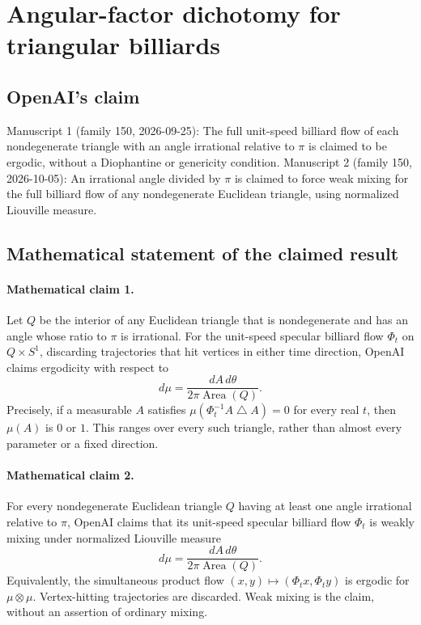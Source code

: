 \documentclass[11pt]{article}
\begin{document}
\section*{Angular-factor dichotomy for triangular billiards}

\subsection{OpenAI's claim}
Manuscript 1 (family 150, 2026-09-25): The full unit-speed billiard flow of each nondegenerate triangle with an angle irrational relative to $\pi$ is claimed to be ergodic, without a Diophantine or genericity condition. Manuscript 2 (family 150, 2026-10-05): An irrational angle divided by $\pi$ is claimed to force weak mixing for the full billiard flow of any nondegenerate Euclidean triangle, using normalized Liouville measure.

\subsection{Mathematical statement of the claimed result}
\paragraph{Mathematical claim 1.} Let $Q$ be the interior of any Euclidean triangle that is nondegenerate and has an angle whose ratio to $\pi$ is irrational. For the unit-speed specular billiard flow $\Phi_t$ on $Q\times S^1$, discarding trajectories that hit vertices in either time direction, OpenAI claims ergodicity with respect to
\[
d\mu=\frac{dA\,d\theta}{2\pi\operatorname{Area}(Q)}.
\]
Precisely, if a measurable $A$ satisfies $\mu(\Phi_t^{-1}A\mathbin{\triangle} A)=0$ for every real $t$, then $\mu(A)$ is $0$ or $1$. This ranges over every such triangle, rather than almost every parameter or a fixed direction.

\paragraph{Mathematical claim 2.} For every nondegenerate Euclidean triangle $Q$ having at least one angle irrational relative to $\pi$, OpenAI claims that its unit-speed specular billiard flow $\Phi_t$ is weakly mixing under normalized Liouville measure
\[
d\mu=\frac{dA\,d\theta}{2\pi\operatorname{Area}(Q)}.
\]
Equivalently, the simultaneous product flow $(x,y)\mapsto(\Phi_tx,\Phi_ty)$ is ergodic for $\mu\otimes\mu$. Vertex-hitting trajectories are discarded. Weak mixing is the claim, without an assertion of ordinary mixing.
\end{document}
